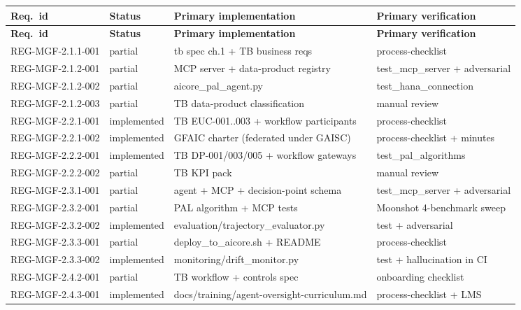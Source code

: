 \footnotesize
\setlength{\tabcolsep}{4pt}
\begin{longtable}{p{3.5cm}p{1.6cm}p{4.6cm}p{3.6cm}}
\toprule
\textbf{Req.\ id} & \textbf{Status} & \textbf{Primary implementation} & \textbf{Primary verification} \\
\midrule
\endfirsthead
\toprule
\textbf{Req.\ id} & \textbf{Status} & \textbf{Primary implementation} & \textbf{Primary verification} \\
\midrule
\endhead
REG-MGF-2.1.1-001 & partial       & tb spec ch.1 + TB business reqs             & process-checklist \\
REG-MGF-2.1.2-001 & partial       & MCP server + data-product registry          & test\_mcp\_server + adversarial \\
REG-MGF-2.1.2-002 & partial       & aicore\_pal\_agent.py                       & test\_hana\_connection \\
REG-MGF-2.1.2-003 & partial       & TB data-product classification              & manual review \\
REG-MGF-2.2.1-001 & implemented   & TB EUC-001..003 + workflow participants     & process-checklist \\
REG-MGF-2.2.1-002 & implemented   & GFAIC charter (federated under GAISC)       & process-checklist + minutes \\
REG-MGF-2.2.2-001 & implemented   & TB DP-001/003/005 + workflow gateways       & test\_pal\_algorithms \\
REG-MGF-2.2.2-002 & partial       & TB KPI pack                                 & manual review \\
REG-MGF-2.3.1-001 & partial       & agent + MCP + decision-point schema         & test\_mcp\_server + adversarial \\
REG-MGF-2.3.2-001 & partial       & PAL algorithm + MCP tests                   & Moonshot 4-benchmark sweep \\
REG-MGF-2.3.2-002 & implemented   & evaluation/trajectory\_evaluator.py         & test + adversarial \\
REG-MGF-2.3.3-001 & partial       & deploy\_to\_aicore.sh + README              & process-checklist \\
REG-MGF-2.3.3-002 & implemented   & monitoring/drift\_monitor.py                & test + hallucination in CI \\
REG-MGF-2.4.2-001 & partial       & TB workflow + controls spec                 & onboarding checklist \\
REG-MGF-2.4.3-001 & implemented   & docs/training/agent-oversight-curriculum.md & process-checklist + LMS \\

\end{longtable}
